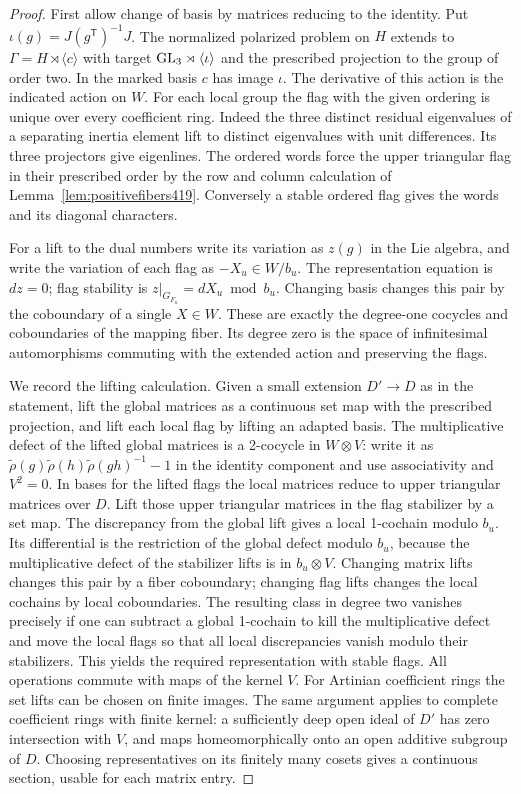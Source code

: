\documentclass[a4paper,11pt]{article}
\theoremstyle{definition}
\theoremstyle{remark}
\numberwithin{equation}{section}
\begin{document}
\begin{proof}
First allow change of basis by matrices reducing to the identity.
Put \(\iota(g)=J(g^{\mathsf T})^{-1}J\). The normalized polarized
problem on \(H\) extends to \(\Gamma=H\rtimes\langle c\rangle\)
with target \({\rm GL}_3\rtimes\langle\iota\rangle\) and the
prescribed projection to the group of order two. In the marked
basis \(c\) has image \(\iota\). The derivative of this action
is the indicated action on \(W\). For each local group the flag
with the given ordering is unique over every coefficient ring.
Indeed the three distinct residual eigenvalues of a separating
inertia element lift to distinct eigenvalues with unit differences.
Its three projectors give eigenlines. The ordered words force the
upper triangular flag in their prescribed order by the row and
column calculation of Lemma~\ref{lem:positivefibers419}. Conversely
a stable ordered flag gives the words and its diagonal characters.

For a lift to the dual numbers write its variation as \(z(g)\)
in the Lie algebra, and write the variation of each flag as
\(-X_u\in W/b_u\). The representation equation is \(dz=0\);
flag stability is \(z|_{G_{F_u}}=dX_u\bmod b_u\). Changing
basis changes this pair by the coboundary of a single \(X\in W\).
These are exactly the degree-one cocycles and coboundaries of
the mapping fiber. Its degree zero is the space of infinitesimal
automorphisms commuting with the extended action and preserving
the flags.

We record the lifting calculation. Given a small extension
\(D'\to D\) as in the statement, lift the global matrices as
a continuous set map with the prescribed projection, and lift
each local flag by lifting an adapted basis. The multiplicative
defect of the lifted global matrices is a 2-cocycle in \(W\otimes V\):
write it as \(\widetilde\rho(g)\widetilde\rho(h)
\widetilde\rho(gh)^{-1}-1\) in the identity component and use
associativity and \(V^2=0\). In bases for the lifted flags the
local matrices reduce to upper triangular matrices over \(D\).
Lift those upper triangular matrices in the flag stabilizer
by a set map. The discrepancy from the global lift gives a
local 1-cochain modulo \(b_u\). Its differential is the
restriction of the global defect modulo \(b_u\), because the
multiplicative defect of the stabilizer lifts is in \(b_u\otimes V\).
Changing matrix lifts changes this pair by a fiber coboundary;
changing flag lifts changes the local cochains by local
coboundaries. The resulting class in degree two vanishes
precisely if one can subtract a global 1-cochain to kill the
multiplicative defect and move the local flags so that all local
discrepancies vanish modulo their stabilizers. This yields the
required representation with stable flags. All operations
commute with maps of the kernel \(V\). For Artinian coefficient
rings the set lifts can be chosen on finite images. The same
argument applies to complete coefficient rings with finite kernel:
a sufficiently deep open ideal of \(D'\) has zero intersection
with \(V\), and maps homeomorphically onto an open additive
subgroup of \(D\). Choosing representatives on its finitely many
cosets gives a continuous section, usable for each matrix entry.


\end{proof}
\end{document}

